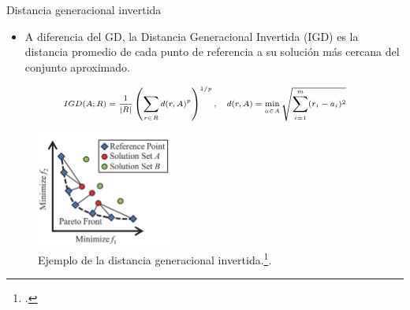 \documentclass{beamer}
\begin{document}
\begin{frame}{Distancia generacional invertida}
\begin{itemize}
\justifying
\scriptsize
\item A diferencia del GD, la Distancia Generacional Invertida (IGD) es la distancia promedio de cada punto de referencia a su solución más cercana del conjunto aproximado.
\end{itemize}
\begin{equation*}
\scriptsize
\begin{split}
IGD(A; R) = \frac{1}{|R|} \left (   \sum_{r \in R} d(r, A)^p \right)^{1/p}, \quad d(r, A) = \min_{a \in A} \sqrt{\sum_{i=1}^m (r_i - a_i)^2}
\end{split}
\end{equation*}

\begin{figure}[H]
\centering
\includegraphics[width=0.4\textwidth]{Images/igd_1.png}
\caption{\scriptsize Ejemplo de la distancia generacional invertida.\footcite{ishibuchi2016sensitivity}.}
\end{figure}
\end{frame}
\end{document}
